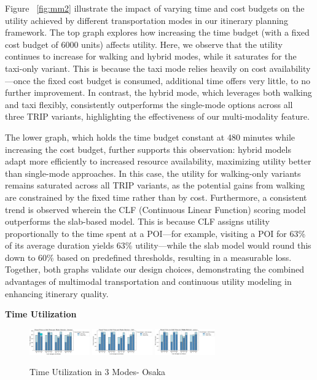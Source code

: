Figure ~\ref{fig:mm2} illustrate the impact of varying time and cost budgets on the utility achieved by different transportation modes in our itinerary planning framework. The top graph explores how increasing the time budget (with a fixed cost budget of 6000 units) affects utility. Here, we observe that the utility continues to increase for walking and hybrid modes, while it saturates for the taxi-only variant. This is because the taxi mode relies heavily on cost availability—once the fixed cost budget is consumed, additional time offers very little, to no further improvement. In contrast, the hybrid mode, which leverages both walking and taxi flexibly, consistently outperforms the single-mode options across all three TRIP variants, highlighting the effectiveness of our multi-modality feature.

The lower graph, which holds the time budget constant at 480 minutes while increasing the cost budget, further supports this observation: hybrid models adapt more efficiently to increased resource availability, maximizing utility better than single-mode approaches. In this case, the utility for walking-only variants remains saturated across all TRIP variants, as the potential gains from walking are constrained by the fixed time rather than by cost. Furthermore, a consistent trend is observed wherein the CLF (Continuous Linear Function) scoring model outperforms the slab-based model. This is because CLF assigns utility proportionally to the time spent at a POI—for example, visiting a POI for 63\% of its average duration yields 63\% utility—while the slab model would round this down to 60\% based on predefined thresholds, resulting in a measurable loss. Together, both graphs validate our design choices, demonstrating the combined advantages of multimodal transportation and continuous utility modeling in enhancing itinerary quality.

\noindent\textbf{Time Utilization}

\begin{figure}[H]
\includegraphics[width=0.23\textwidth]{plots/TIME_UTILIZATION_BINARY.png}
\includegraphics[width=0.23\textwidth]{plots/TIME_UTILIZATION_CLF.png}
\centering
\includegraphics[width=0.23\textwidth]{plots/TIME_UTILIZATION_SLABS.png}
\caption{Time Utilization in 3 Modes- Osaka}
\label{fig:TimeUtilization}
\end{figure}

